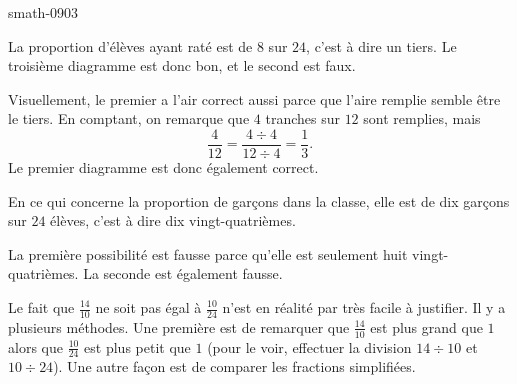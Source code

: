 
\begin{corrige}{smath-0903}

    La proportion d'élèves ayant raté est de \( 8\) sur \( 24\), c'est à dire un tiers. Le troisième diagramme est donc bon, et le second est faux.

    Visuellement, le premier a l'air correct aussi parce que l'aire remplie semble être le tiers. En comptant, on remarque que \( 4\) tranches sur \( 12\) sont remplies, mais
    \begin{equation}
        \frac{ 4 }{ 12 }=\frac{ 4\div 4 }{ 12\div 4 }=\frac{ 1 }{ 3 }.
    \end{equation}
    Le premier diagramme est donc également correct.

    En ce qui concerne la proportion de garçons dans la classe, elle est de dix garçons sur \( 24\) élèves, c'est à dire dix vingt-quatrièmes.

    La première possibilité est fausse parce qu'elle est seulement huit vingt-quatrièmes. La seconde est également fausse.

    Le fait que \( \frac{ 14 }{ 10 }\) ne soit pas égal à \( \frac{ 10 }{ 24 }\) n'est en réalité par très facile à justifier. Il y a plusieurs méthodes. Une première est de remarquer que \( \frac{ 14 }{ 10 }\) est plus grand que \( 1\) alors que \( \frac{ 10 }{ 24 }\) est plus petit que \( 1\) (pour le voir, effectuer la division \( 14\div 10\) et \( 10\div 24\)). Une autre façon est de comparer les fractions simplifiées.

\end{corrige}

